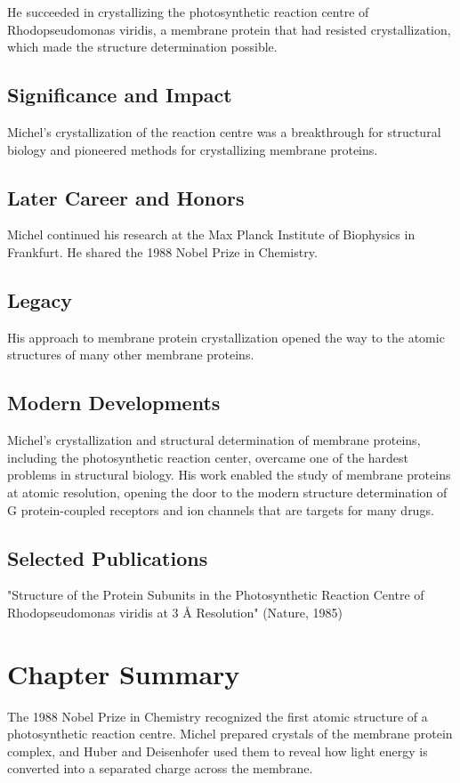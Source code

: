 He succeeded in crystallizing the photosynthetic reaction centre of Rhodopseudomonas viridis, a membrane protein that had resisted crystallization, which made the structure determination possible.

\subsection*{Significance and Impact}

Michel's crystallization of the reaction centre was a breakthrough for structural biology and pioneered methods for crystallizing membrane proteins.

\subsection*{Later Career and Honors}

Michel continued his research at the Max Planck Institute of Biophysics in Frankfurt. He shared the 1988 Nobel Prize in Chemistry.

\subsection*{Legacy}

His approach to membrane protein crystallization opened the way to the atomic structures of many other membrane proteins.

\subsection*{Modern Developments}

Michel's crystallization and structural determination of membrane proteins, including the photosynthetic reaction center, overcame one of the hardest problems in structural biology. His work enabled the study of membrane proteins at atomic resolution, opening the door to the modern structure determination of G protein-coupled receptors and ion channels that are targets for many drugs.

\subsection*{Selected Publications}

"Structure of the Protein Subunits in the Photosynthetic Reaction Centre of Rhodopseudomonas viridis at 3 Å Resolution" (Nature, 1985)

\clearpage

\section*{Chapter Summary}

The 1988 Nobel Prize in Chemistry recognized the first atomic structure of a photosynthetic reaction centre. Michel prepared crystals of the membrane protein complex, and Huber and Deisenhofer used them to reveal how light energy is converted into a separated charge across the membrane.
